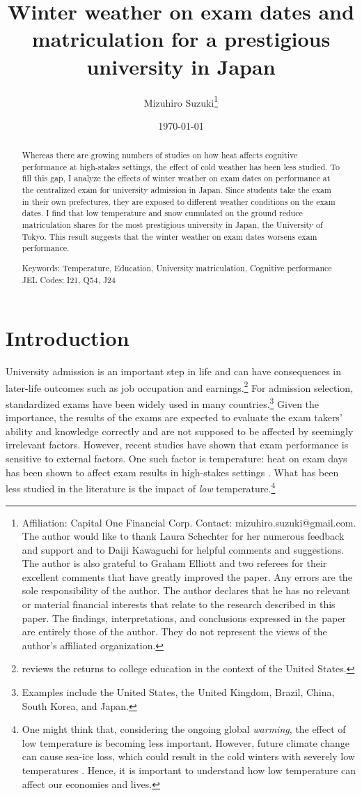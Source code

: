 \documentclass[12pt,letterpaper]{article}
\title{Winter weather on exam dates and matriculation for a prestigious university in Japan}
\author{
  Mizuhiro Suzuki\thanks{
    Affiliation: Capital One Financial Corp.
    Contact: mizuhiro.suzuki@gmail.com.
    The author would like to thank Laura Schechter for her numerous feedback and support and to Daiji Kawaguchi for helpful comments and suggestions.
    The author is also grateful to Graham Elliott and two referees for their excellent comments that have greatly improved the paper.
    Any errors are the sole responsibility of the author.
    The author declares that he has no relevant or material financial interests that relate to the research described in this paper.
    The findings, interpretations, and conclusions expressed in the paper are entirely those of the author.
    They do not represent the views of the author's affiliated organization.
  }
}
\date{\today}
\begin{document}
  
\maketitle
\begin{abstract}
  \singlespacing
    \noindent 
    Whereas there are growing numbers of studies on how heat affects cognitive performance at high-stakes settings, the effect of cold weather has been less studied.
    To fill this gap, I analyze the effects of winter weather on exam dates on performance at the centralized exam for university admission in Japan.
    Since students take the exam in their own prefectures, they are exposed to different weather conditions on the exam dates.
    I find that low temperature and snow cumulated on the ground reduce matriculation shares for the most prestigious university in Japan, the University of Tokyo.
    This result suggests that the winter weather on exam dates worsens exam performance.


  \medskip
  \vspace{1cm}
  \noindent Keywords: Temperature, Education, University matriculation, Cognitive performance
  \vspace{1cm}
  JEL Codes: I21, Q54, J24
\end{abstract}

\newpage

\section{Introduction}

University admission is an important step in life and can have consequences in later-life outcomes such as job occupation and earnings.\footnote{
  \citet{Hout2012} reviews the returns to college education in the context of the United States.
}
For admission selection, standardized exams have been widely used in many countries.\footnote{
  Examples include the United States, the United Kingdom, Brazil, China, South Korea, and Japan.
}
Given the importance, the results of the exams are expected to evaluate the exam takers' ability and knowledge correctly and are not supposed to be affected by seemingly irrelevant factors.
However, recent studies have shown that exam performance is sensitive to external factors.
One such factor is temperature:
heat on exam days has been shown to affect exam results in high-stakes settings \citep{Park2020a, GraffZivin2020, Melo2019}.
What has been less studied in the literature is the impact of \textit{low} temperature.\footnote{
  One might think that, considering the ongoing global \textit{warming}, the effect of low temperature is becoming less important.
  However, future climate change can cause sea-ice loss, which could result in the cold winters with severely low temperatures \citep{Kretschmer2016, Kim2014}.
  Hence, it is important to understand how low temperature can affect our economies and lives.
}
\end{document}
